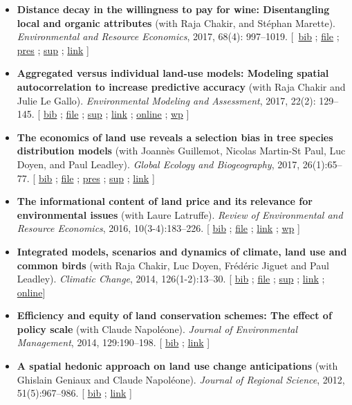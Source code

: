 \documentclass[11pt, a4paper]{./style}
\begin{document}
\begin{itemize}
\item \textbf{Distance decay in the willingness to pay for wine: Disentangling
local and organic attributes} (with Raja Chakir, and Stéphan
Marette). \emph{Environmental and Resource Economics}, 2017, 68(4):
997--1019. [~\href{bib/DWTP.bib}{bib} ; \href{doc/DWTP-FILE.pdf}{file} ; \href{doc/DWTP-PRES.pdf}{pres} ; \href{doc/DWTP-SUP.pdf}{sup} ; \href{https://link.springer.com/article/10.1007/s10640-016-0057-8}{link} ]
\item \textbf{Aggregated versus individual land-use models: Modeling spatial
autocorrelation to increase predictive accuracy} (with Raja
Chakir and Julie Le Gallo). \emph{Environmental Modeling and
Assessment}, 2017, 22(2): 129--145. [ \href{bib/LUMP.bib}{bib} ; \href{doc/LUMP-FILE.pdf}{file} ; \href{doc/LUMP-SUP.pdf}{sup} ; \href{https://link.springer.com/article/10.1007/s10666-016-9523-5}{link} ;
\href{https://github.com/jsay/spatial-pred-R}{online} ;  \href{https://www6.versailles-grignon.inra.fr/economie\_publique/Media/fichiers/Working-Papers/Working-Papers-2014/WP\_2014\_02}{wp} ]
\item \textbf{The economics of land use reveals a selection bias in tree
species distribution models} (with Joannès Guillemot, Nicolas
Martin-St Paul, Luc Doyen, and Paul Leadley). \emph{Global Ecology and
Biogeography}, 2017, 26(1):65--77. [ \href{bib/NTSDM.bib}{bib} ; \href{doc/NTSDM-FILE.pdf}{file} ; \href{doc/NTSDM-PRES.pdf}{pres} ; \href{doc/NTSDM-SUP.pdf}{sup} ;
\href{https://onlinelibrary.wiley.com/doi/abs/10.1111/geb.12514}{link} ]
\item \textbf{The informational content of land price and its relevance for
environmental issues} (with Laure Latruffe). \emph{Review of
Environmental and Resource Economics}, 2016, 10(3-4):183--226. [
\href{bib/RLP.bib}{bib} ; \href{doc/RLP-FILE.pdf}{file} ; \href{https://www.nowpublishers.com/article/Details/IRERE-0086}{link} ; \href{http://www.ceps.be/book/empirical-content-present-value-model-survey-instrumental-uses-farmland-prices.html}{wp} ]
\item \textbf{Integrated models, scenarios and dynamics of climate, land use
and common birds} (with Raja Chakir, Luc Doyen, Frédéric Jiguet
and Paul Leadley). \emph{Climatic Change}, 2014, 126(1-2):13--30. [
\href{bib/CILE.bib}{bib} ; \href{doc/CILE-FILE.pdf}{file} ; \href{doc/CILE-SUP.pdf}{sup} ; \href{https://link.springer.com/article/10.1007/s10584-014-1202-4}{link} ; \href{https://mobilis-a4ac2.firebaseapp.com/index.html}{online}]
\item \textbf{Efficiency and equity of land conservation schemes: The effect
of policy scale} (with Claude Napoléone). \emph{Journal of
Environmental Management}, 2014, 129:190--198. [ \href{bib/EELC.bib}{bib} ; \href{http://www.sciencedirect.com/science/article/pii/S0301479713004829}{link} ]
\item \textbf{A spatial hedonic approach on land use change anticipations}
(with Ghislain Geniaux and Claude Napoléone). \emph{Journal of
Regional Science}, 2012, 51(5):967--986. [ \href{bib/SPHED.bib}{bib} ; \href{http://onlinelibrary.wiley.com/doi/10.1111/j.1467-9787.2011.00721.x/abstract}{link} ]
\end{itemize}
\end{document}
